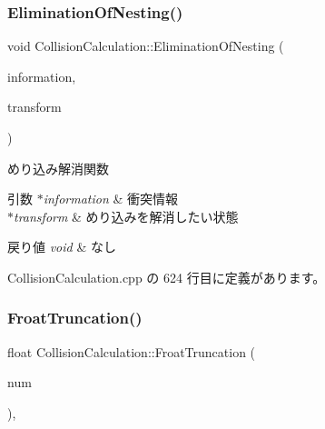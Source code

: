 \mbox{\label{class_collision_calculation_a4e468d6ff8add6b08f0b65d3e7128411}} 
\subsubsection{\texorpdfstring{Elimination\+Of\+Nesting()}{EliminationOfNesting()}}
{\footnotesize\ttfamily void Collision\+Calculation\+::\+Elimination\+Of\+Nesting (\begin{DoxyParamCaption}\item[{\mbox{\hyperlink{class_collision_information}{Collision\+Information}} $\ast$}]{information,  }\item[{\mbox{\hyperlink{class_transform}{Transform}} $\ast$}]{transform }\end{DoxyParamCaption})\hspace{0.3cm}{\ttfamily [static]}}



めり込み解消関数 


\begin{DoxyParams}{引数}
{\em $\ast$information} & 衝突情報 \\
\hline
{\em $\ast$transform} & めり込みを解消したい状態 \\
\hline
\end{DoxyParams}

\begin{DoxyRetVals}{戻り値}
{\em void} & なし \\
\hline
\end{DoxyRetVals}


 Collision\+Calculation.\+cpp の 624 行目に定義があります。

\mbox{\label{class_collision_calculation_a3123f561d5ba6af08336523205a5d8a8}} 
\subsubsection{\texorpdfstring{Froat\+Truncation()}{FroatTruncation()}}
{\footnotesize\ttfamily float Collision\+Calculation\+::\+Froat\+Truncation (\begin{DoxyParamCaption}\item[{float}]{num }\end{DoxyParamCaption})\hspace{0.3cm}{\ttfamily [static]}, {\ttfamily [private]}}



